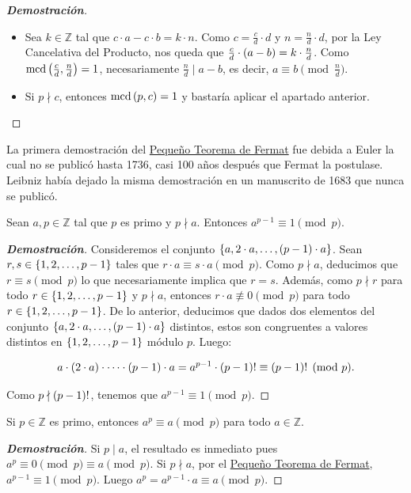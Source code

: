 \begin{proposition}
\begin{proof}[\rm\textbf{Demostración}]
\begin{itemize}
      \item[3.] Sea $k\in\mathbb{Z}$ tal que $c\cdot a-c\cdot b=k\cdot n$. Como $c=\frac{c}{d}\cdot d$ y $n=\frac{n}{d}\cdot d$, por la Ley Cancelativa del Producto, nos queda que $\frac{c}{d}\cdot \left(a-b\right)=k\cdot\frac{n}{d}$. Como $\text{mcd}\left(\frac{c}{d},\frac{n}{d}\right)=1$, necesariamente $\frac{n}{d}\mid a-b$, es decir, $a\equiv b\pmod{\frac{n}{d}}$.
      \item[4.] Si $p\nmid c$, entonces $\text{mcd}\left(p,c\right)=1$ y bastaría aplicar el apartado anterior.
    \end{itemize}
  \end{proof}
\end{proposition}

La primera demostración del \hyperref[Pequeño Teorema de Fermat]{Pequeño Teorema de Fermat} fue debida a Euler la cual no se publicó hasta 1736, casi 100 años después que Fermat la postulase. Leibniz había dejado la misma demostración en un manuscrito de 1683 que nunca se publicó.

\begin{theorem}\label{Pequeño Teorema de Fermat}
  \rm Sean $a,p\in\mathbb{Z}$ tal que $p$ es primo y $p\nmid a$. Entonces $a^{p-1}\equiv 1\pmod{p}$.
  \begin{proof}[\rm\textbf{Demostración}]
    Consideremos el conjunto $\left\{a,2\cdot a,\dots,\left(p-1\right)\cdot a\right\}$. Sean $r,s\in\left\{1,2,\dots,p-1\right\}$ tales que $r\cdot a\equiv s\cdot a\pmod{p}$. Como $p\nmid a$, deducimos que $r\equiv s\pmod{p}$ lo que necesariamente implica que $r=s$. Además, como $p\nmid r$ para todo $r\in\left\{1,2,\dots, p-1\right\}$ y $p\nmid a$, entonces $r\cdot a\not\equiv 0\pmod{p}$ para todo $r\in\left\{1,2,\dots, p-1\right\}$. De lo anterior, deducimos que dados dos elementos del conjunto $\left\{a,2\cdot a,\dots,\left(p-1\right)\cdot a\right\}$ distintos, estos son congruentes a valores distintos en $\left\{1,2,\dots, p-1\right\}$ módulo $p$. Luego:

    \begin{equation}
      a\cdot\left(2\cdot a\right)\cdot\cdots\cdot\left(p-1\right)\cdot a= a^{p-1}\cdot\left(p-1\right)!\equiv\left(p-1\right)!\pmod{p}.
    \end{equation}

    Como $p\nmid\left(p-1\right)!$, tenemos que $a^{p-1}\equiv 1\pmod{p}$. %
  \end{proof}
\end{theorem}

\begin{corollary}
  \rm Si $p\in\mathbb{Z}$ es primo, entonces $a^p\equiv a\pmod{p}$ para todo $a\in\mathbb{Z}$.
  \begin{proof}[\rm\textbf{Demostración}]
    Si $p\mid a$, el resultado es inmediato pues $a^p\equiv 0\pmod{p}\equiv a\pmod{p}$. Si $p\nmid a$, por el \hyperref[Pequeño Teorema de Fermat]{Pequeño Teorema de Fermat}, $a^{p-1}\equiv 1\pmod{p}$. Luego $a^p=a^{p-1}\cdot a\equiv a\pmod{p}$.
  \end{proof}
\end{corollary}